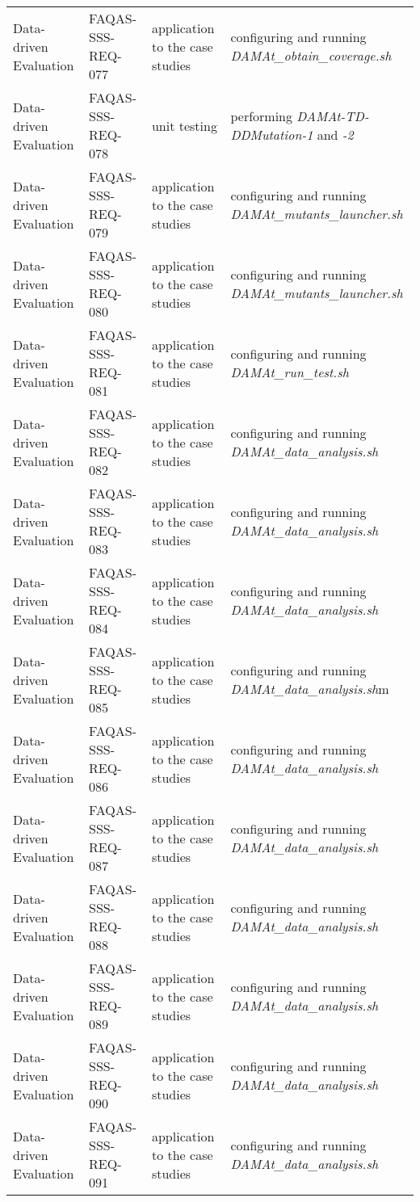 \begin{table}[h!]
{\begin{tabular}{|l|l|l|l|}
Data-driven Evaluation & FAQAS-SSS-REQ-077 & application to the case studies & configuring and running \emph{DAMAt\_obtain\_coverage.sh} \\
Data-driven Evaluation & FAQAS-SSS-REQ-078 & unit testing &  performing \emph{DAMAt-TD-DDMutation-1} and \emph{-2} \\
Data-driven Evaluation & FAQAS-SSS-REQ-079 & application to the case studies & configuring and running \emph{DAMAt\_mutants\_launcher.sh}\\
Data-driven Evaluation & FAQAS-SSS-REQ-080 & application to the case studies & configuring and running \emph{DAMAt\_mutants\_launcher.sh} \\
Data-driven Evaluation & FAQAS-SSS-REQ-081 & application to the case studies & configuring and running \emph{DAMAt\_run\_test.sh}\\
Data-driven Evaluation & FAQAS-SSS-REQ-082 & application to the case studies & configuring and running \emph{DAMAt\_data\_analysis.sh} \\
Data-driven Evaluation & FAQAS-SSS-REQ-083 & application to the case studies & configuring and running \emph{DAMAt\_data\_analysis.sh} \\
Data-driven Evaluation & FAQAS-SSS-REQ-084 & application to the case studies & configuring and running \emph{DAMAt\_data\_analysis.sh} \\
Data-driven Evaluation & FAQAS-SSS-REQ-085 & application to the case studies & configuring and running \emph{DAMAt\_data\_analysis.sh}m \\
Data-driven Evaluation & FAQAS-SSS-REQ-086 & application to the case studies & configuring and running \emph{DAMAt\_data\_analysis.sh} \\
Data-driven Evaluation & FAQAS-SSS-REQ-087 & application to the case studies & configuring and running \emph{DAMAt\_data\_analysis.sh} \\
Data-driven Evaluation & FAQAS-SSS-REQ-088 & application to the case studies & configuring and running \emph{DAMAt\_data\_analysis.sh} \\
Data-driven Evaluation & FAQAS-SSS-REQ-089 & application to the case studies & configuring and running \emph{DAMAt\_data\_analysis.sh}\\
Data-driven Evaluation & FAQAS-SSS-REQ-090 & application to the case studies & configuring and running \emph{DAMAt\_data\_analysis.sh} \\
Data-driven Evaluation & FAQAS-SSS-REQ-091 & application to the case studies & configuring and running \emph{DAMAt\_data\_analysis.sh} \\

\end{tabular}}
\end{table}
